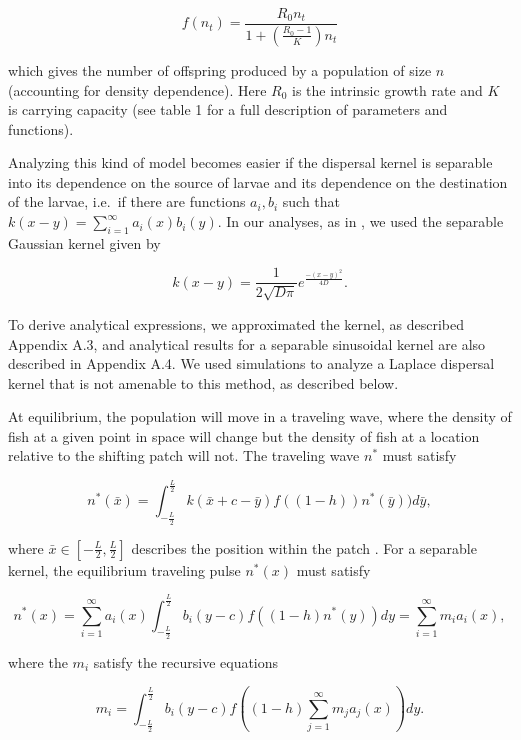 \documentclass[12pt,english]{article}
\begin{document}
\begin{spacing}{1.9}
\begin{flushleft}
\[f(n_t)=\frac{R_0n_t}{1+\left(\frac{R_0-1}{K}\right)n_t}\]  

\noindent  which gives the number of offspring produced by a population of size $n$ (accounting for density dependence). Here $R_0$ is the intrinsic growth rate and $K$ is carrying capacity (see table 1 for a full description of parameters and functions). 

Analyzing this kind of model becomes easier if the dispersal kernel is separable into its dependence on the source of larvae and its dependence on the destination of the larvae, i.e.~if there are functions $a_i, b_i$ such that $k(x- y) = \sum^\infty_{i=1} a_i(x)b_i(y)$.  In our analyses, as in \cite{Latore:1998fk}, we used the separable Gaussian kernel given by

\[k(x-y)=\frac{1}{2\sqrt{D\pi}}e^{\frac{-(x-y)^2}{4D}}.\]

\noindent To derive analytical expressions, we approximated the kernel, as described Appendix A.3, and analytical results for a separable sinusoidal kernel are also described in Appendix A.4.  We used simulations to analyze a Laplace dispersal kernel that is not amenable to this method, as described below.  %

At equilibrium, the population will move in a traveling wave, where the density of fish at a given point in space will change but the density of fish at a location relative to the shifting patch will not. The traveling wave $n^*$ must satisfy

\begin{equation}
n^*(\bar{x})=\int^{\frac{L}{2}}_{-\frac{L}{2}}k(\bar{x}+c-\bar{y})f((1-h))n^*(\bar{y}))d
\bar{y}, \label{traveling_pulse}
\end{equation}

\noindent where $\bar{x}\in\left[-\frac{L}{2}, \frac{L}{2}\right]$ describes the position within the patch \citep{ZhouKot2011}. For a separable kernel, the equilibrium traveling pulse $n^*(x)$ must satisfy 

\begin{equation}
n^*(x)=\sum^\infty_{i=1}
a_i(x)\int^{\frac{L}{2}}_{-\frac{L}{2}}b_i(y-c)f((1-h)n^*(y))dy=\sum^\infty_{i=1}m_ia_i(x), \label{separable_integrodifference}
\end{equation}

\noindent where the $m_i$ satisfy the recursive equations

\begin{equation}
m_i=\int^{\frac{L}{2}}_{-\frac{L}{2}}b_i(y-c)f\left((1-h)\sum^\infty_{j=1}m_ja_j(x)\right)
dy. \label{recursive_m}
\end{equation}


\end{flushleft}
\end{spacing}
\end{document}
